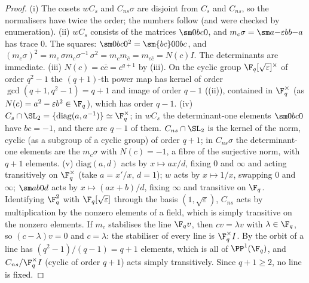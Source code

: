 \begin{proof}
(i) The cosets $wC_s$ and $C_{ns}\sigma$ are disjoint from $C_s$ and $C_{ns}$, so the normalisers have twice the order; the numbers follow (and were checked by
enumeration). (ii) $wC_s$ consists of the matrices $\sm0bc0$, and $m_c\sigma=\sm a{-\varepsilon b}b{-a}$ has trace $0$. The squares: $\sm0bc0^2=\sm{bc}00{bc}$, and
$(m_c\sigma)^2=m_c\,\sigma m_c\sigma^{-1}\,\sigma^2=m_cm_{\bar c}=m_{c\bar c}=N(c)I$. The determinants are immediate. (iii) $N(c)=c\bar c=c^{q+1}$ by
(iii). On the cyclic group $\F_q[\sqrt\varepsilon]^\times$ of order $q^2-1$ the $(q+1)$-th power map has kernel of order $\gcd(q+1,q^2-1)=q+1$ and
image of order $q-1$ ((ii)), contained in $\F_q^\times$ (as $N(c)=a^2-\varepsilon b^2\in\F_q$), which has order $q-1$. (iv) $C_s\cap\SL_2=\{\mathrm{diag}(a,a^{-1})\}\simeq\F_q^\times$;
in $wC_s$ the determinant-one elements $\sm0bc0$ have $bc=-1$, and there are $q-1$ of them. $C_{ns}\cap\SL_2$ is the kernel of the norm, cyclic (as a subgroup of a
cyclic group) of order $q+1$; in $C_{ns}\sigma$ the determinant-one elements are the $m_c\sigma$ with $N(c)=-1$, a fibre of the surjective norm, with $q+1$ elements.
(v) $\mathrm{diag}(a,d)$ acts by $x\mapsto ax/d$, fixing $0$ and $\infty$ and acting transitively on $\F_q^\times$ (take $a=x'/x$, $d=1$); $w$ acts by $x\mapsto1/x$, swapping $0$ and
$\infty$; $\sm ab0d$ acts by $x\mapsto(ax+b)/d$, fixing $\infty$ and transitive on $\F_q$. Identifying $\F_q^2$ with $\F_q[\sqrt\varepsilon]$ through the basis $(1,\sqrt\varepsilon)$,
$C_{ns}$ acts by multiplication by the nonzero elements of a field, which is simply transitive on the nonzero elements. If $m_c$ stabilises the line $\F_qv$, then $cv=\lambda v$
with $\lambda\in\F_q$, so $(c-\lambda)v=0$ and $c=\lambda$: the stabiliser of every line is $\F_q^\times I$. By  the orbit of a line has
$(q^2-1)/(q-1)=q+1$ elements, which is all of $\PP^1(\F_q)$, and $C_{ns}/\F_q^\times I$ (cyclic of order $q+1$) acts simply transitively. Since $q+1\ge2$, no line is fixed.
\end{proof}

